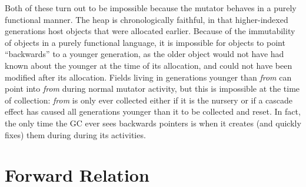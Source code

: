Both of these turn out to be impossible because the 
mutator behaves in a purely functional manner.
The heap is chronologically
faithful, in that higher-indexed generations host
objects that were allocated earlier. Because
of the immutability of objects in a purely functional language, 
it is impossible for objects to point ``backwards'' to 
a younger generation, as the older object would not have
had known about the younger at the time of its allocation, and could not 
have been modified after its allocation. Fields living in generations 
younger than \emph{from} can point into \emph{from} during 
normal mutator activity, but this is
impossible at the time of collection: 
\emph{from} is only ever collected either if it is
the nursery or if a cascade effect has caused all generations younger
than it to be collected and reset. 
In fact, the only time the GC ever sees backwards pointers
is when it creates (and quickly fixes) them during during its 
activities.

\section{Forward Relation}
\label{apx:forwardrelation}


% 
